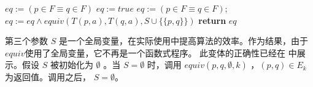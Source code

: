 \begin{algorithm}
    \small
    \begin{algorithmic}[1]
                $ eq := ( p \in F \equiv q \in F ) $
                $eq := true$
                \State $ eq := ( p \in F \equiv q \in F ) $;
                    \State $eq:= eq \land equiv ( T(p,a),T(q,a),S\cup \{ \{ p,q\} \}  ) $
                \EndFor
            \EndIf
            \State \textbf{return} $eq$
        \EndFunction
    \end{algorithmic}
\end{algorithm}
第三个参数 $S$ 是一个全局变量，在实际使用中提高算法的效率。作为结果，由于$equiv$使用了全局变量，它不再是一个函数式程序。%
此变体的正确性已经在 \cite{t-Ei91} 中展示。假设 $S$ 被初始化为 $\emptyset$ 。当 $ S =\emptyset $ 时，调用 $equiv(p,q,\emptyset,k)$ ，$ (p,q) \in E_k $ 为返回值。调用之后， $S = \emptyset$。%
